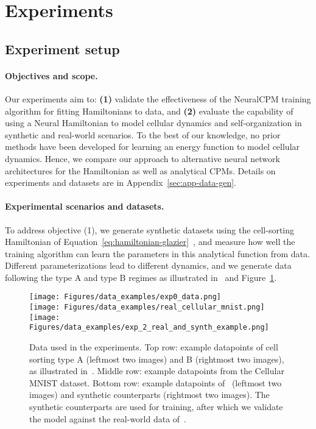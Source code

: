 \section{Experiments}\label{sec:results}

\subsection{Experiment setup}


\paragraph{Objectives and scope.}
Our experiments aim to: \textbf{(1)} validate the effectiveness of the NeuralCPM training algorithm for fitting Hamiltonians to data, and \textbf{(2)} evaluate the capability of using a Neural Hamiltonian to model cellular dynamics and self-organization in synthetic and real-world scenarios. To the best of our knowledge, no prior methods have been developed for learning an energy function to model cellular dynamics. Hence, we compare our approach to alternative neural network architectures for the Hamiltonian as well as analytical CPMs. Details on experiments and datasets are in Appendix~\ref{sec:app-data-gen}.

\paragraph{Experimental scenarios and datasets.}

To address objective (1), we generate synthetic datasets using the cell-sorting Hamiltonian of Equation~\ref{eq:hamiltonian-glazier}~\cite{Graner1992}, and measure how well the training algorithm can learn the parameters in this analytical function from data. Different parameterizations lead to different dynamics, and we generate data following the type A and type B regimes as illustrated in~\cite{edelstein2023simplecellsort} and Figure~\ref{fig:data_examples}.

\begin{figure}[t]
    \centering
    \texttt{[image: Figures/data\_examples/exp0\_data.png]}\\
    \texttt{[image: Figures/data\_examples/real\_cellular\_mnist.png]}\\
    \texttt{[image: Figures/data\_examples/exp\_2\_real\_and\_synth\_example.png]}\\
    \caption{Data used in the experiments. Top row: example datapoints of cell sorting type A (leftmost two images) and B (rightmost two images), as illustrated in~\citet{edelstein2023simplecellsort}.
    Middle row: example datapoints from the Cellular MNIST dataset.
    Bottom row: example datapoints of~\citet{Toda2018Science} (leftmost two images) and synthetic counterparts (rightmost two images). The synthetic counterparts are used for training, after which we validate the model against the real-world data of~\citet{Toda2018Science}.}
    \label{fig:data_examples}
\end{figure}

